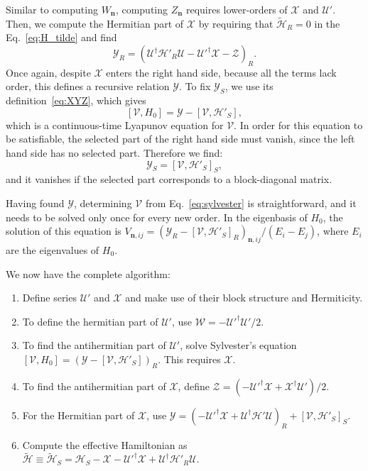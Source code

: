 %
Similar to computing $W_{\mathbf{n}}$, computing $Z_{\mathbf{n}}$ requires lower-orders of $\mathcal{X}$ and $\mathcal{U}'$.
Then, we compute the Hermitian part of $\mathcal{X}$ by requiring that $\tilde{\mathcal{H}}_{R} = 0$ in the Eq.~\eqref{eq:H_tilde} and find
%
\begin{equation}
\label{eq:Y_R}
\mathcal{Y}_{R} = (\mathcal{U}^\dagger \mathcal{H}'_{R} \mathcal{U} -
\mathcal{U}'^\dagger \mathcal{X} - \mathcal{Z})_{R}.
\end{equation}
%
Once again, despite $\mathcal{X}$ enters the right hand side, because all the terms lack  order, this defines a recursive relation $\mathcal{Y}$.
To fix $\mathcal{Y}_S$, we use its definition~\eqref{eq:XYZ}, which gives
\begin{equation}
  \label{eq:sylvester}
  [\mathcal{V}, H_0] = \mathcal{Y} - [\mathcal{V}, \mathcal{H}'_{S}],
\end{equation}
which is a continuous-time Lyapunov equation for $\mathcal{V}$.
In order for this equation to be satisfiable, the selected part of the right hand side must vanish, since the left hand side has no selected part.
Therefore we find:
%
\begin{equation}
\label{eq:Y_S}
\mathcal{Y}_{S} = [\mathcal{V}, \mathcal{H}'_{S}]_{S},
\end{equation}
and it vanishes if the selected part corresponds to a block-diagonal matrix.

Having found $\mathcal{Y}$, determining $\mathcal{V}$ from Eq.~\eqref{eq:sylvester} is straightforward, and it needs to be solved only once for every new order.
In the eigenbasis of $H_0$, the solution of this equation is $V_{\mathbf{n}, ij} = (\mathcal{Y}_{R} - [\mathcal{V}, \mathcal{H}'_{S}]_{R})_{\mathbf{n}, ij}/(E_i - E_j)$, where $E_i$ are the eigenvalues of $H_0$.

We now have the complete algorithm:
%
\begin{enumerate}
    \item Define series $\mathcal{U}'$ and $\mathcal{X}$ and make use of their block structure and Hermiticity.
    \item To define the hermitian part of $\mathcal{U}'$, use $\mathcal{W} = -\mathcal{U}'^\dagger\mathcal{U}'/2$.
    \item To find the antihermitian part of $\mathcal{U}'$, solve Sylvester's equation \\ $[\mathcal{V}, H_0] = (\mathcal{Y} - [\mathcal{V}, \mathcal{H}'_{S}])_{R}$.
      This requires $\mathcal{X}$.
    \item To find the antihermitian part of $\mathcal{X}$, define $\mathcal{Z} = (-\mathcal{U}'^\dagger\mathcal{X} + \mathcal{X}^\dagger\mathcal{U}')/2$.
    \item For the Hermitian part of $\mathcal{X}$, use $\mathcal{Y} = (-\mathcal{U}'^\dagger\mathcal{X} + \mathcal{U}^\dagger\mathcal{H}'\mathcal{U})_{R} + [\mathcal{V}, \mathcal{H}'_{S}]_{S}$.
    \item  Compute the effective Hamiltonian as $\tilde{\mathcal{H}} \equiv \tilde{\mathcal{H}}_{S} = \mathcal{H}_{S} - \mathcal{X} - \mathcal{U}'^\dagger \mathcal{X} + \mathcal{U}^\dagger\mathcal{H}'_{R}\mathcal{U}$.
\end{enumerate}

